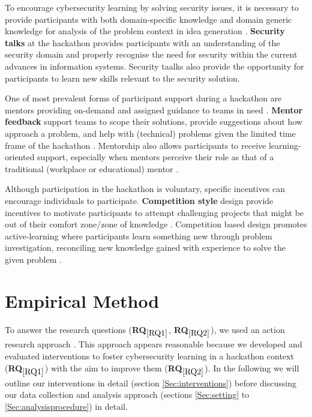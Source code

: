 \documentclass[runningheads]{llncs}
\newcommand{\hr}[1]{\textbf{RQ}$_{\ref{#1}}$}
\begin{document}
To encourage cybersecurity learning by solving security issues, it is necessary to provide participants with both domain-specific knowledge and domain generic knowledge for analysis of the problem context in idea generation \cite{stoyanov2007effect}.
\textbf{Security talks} at the hackathon provides participants with an understanding of the security domain and properly recognise the need for security within the current advances in information systems. Security taalks also provide the opportunity for participants to learn new skills \cite{horton2018project} relevant to the security solution.

One of most prevalent forms of participant support during a hackathon are mentors providing on-demand and assigned guidance to teams in need \cite{soltani2014hackathon,byrne2017iot}. \textbf{Mentor feedback} support teams to scope their solutions, provide suggestions about how approach a problem, and help with (technical) problems given the limited time frame of the hackathon \cite{lara2016hackathons}.
Mentorship also allows participants to receive learning-oriented support, especially when mentors perceive their role as that of a traditional (workplace or educational) mentor \cite{nolte2020support}.

Although participation in the hackathon is voluntary, specific incentives can encourage individuals to participate. \textbf{Competition style} design provide incentives to motivate participants to attempt challenging projects that might be out of their comfort zone/zone of knowledge \cite{grimes2008robotics}. Competition based design promotes active-learning where participants learn something new through problem investigation, reconciling new knowledge gained with experience to solve the given problem \cite{stoyanov2007effect}.

\section{Empirical Method}
To answer the research questions (\hr{RQ1}, \hr{RQ2}), we used an action research approach \cite{lewin1946action}. This approach appears reasonable because we developed and evaluated interventions to foster cybersecurity learning in a hackathon context (\hr{RQ1}) with the aim to improve them (\hr{RQ2}). In the following we will outline our interventions in detail (section \ref{Sec:interventions}) before discussing our data collection and analysis approach (sections \ref{Sec:setting} to \ref{Sec:analysisprocedure}) in detail.
\end{document}
